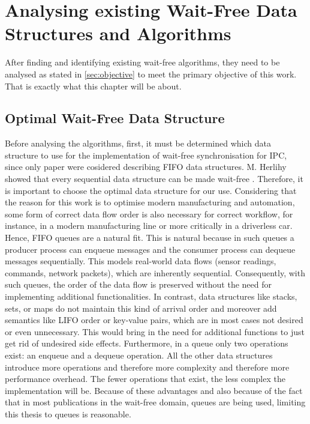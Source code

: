 \chapter{Analysing existing Wait-Free Data Structures and Algorithms}\label{ch:choosing-the-optimal-wait-free-data-structure}
After finding and identifying existing wait-free algorithms, they need to be analysed as stated in \cref{sec:objective} to meet the primary objective of this work. That is exactly what this chapter will be about.

\section{Optimal Wait-Free Data Structure}\label{sec:optimal-wait-free-data-structure}
Before analysing the algorithms, first, it must be determined which data structure to use for the implementation of wait-free synchronisation for \ac{IPC}, since only paper were cosidered describing \ac{FIFO} data structures. M. Herlihy showed that every sequential data structure can be made wait-free \cite{herlihy1991wait}. Therefore, it is important to choose the optimal data structure for our use. Considering that the reason for this work is to optimise modern manufacturing and automation, some form of correct data flow order is also necessary for correct workflow, for instance, in a modern manufacturing line or more critically in a driverless car. Hence, \ac{FIFO} queues are a natural fit. This is natural because in such queues a producer process can enqueue messages and the consumer process can dequeue messages sequentially. This models real-world data flows (sensor readings, commands, network packets), which are inherently sequential. Consequently, with such queues, the order of the data flow is preserved without the need for implementing additional functionalities. In contrast, data structures like stacks, sets, or maps do not maintain this kind of arrival order and moreover add semantics like \ac{LIFO} order or key-value pairs, which are in most cases not desired or even unnecessary. This would bring in the need for additional functions to just get rid of undesired side effects. Furthermore, in a queue only two operations exist: an enqueue and a dequeue operation. All the other data structures introduce more operations and therefore more complexity and therefore more performance overhead. The fewer operations that exist, the less complex the implementation will be. Because of these advantages and also because of the fact that in most publications in the wait-free domain, queues are being used, limiting this thesis to queues is reasonable. \cite{jiffy}

